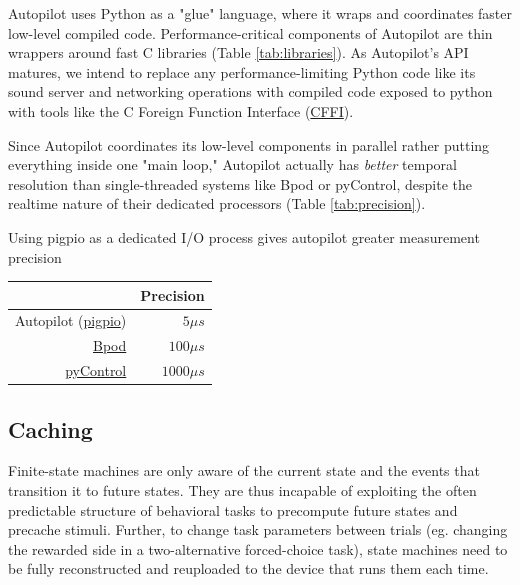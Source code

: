 Autopilot uses Python as a "glue" language, where it wraps and coordinates faster low-level compiled code\citep{vanrossumGlueItAll1998}.  
Performance-critical components of Autopilot are thin wrappers around fast C libraries (Table \ref{tab:libraries}). As Autopilot's API matures, we intend to replace any performance-limiting Python code like its sound server and networking operations with compiled code exposed to python with tools like the C Foreign Function Interface (\href{https://cffi.readthedocs.io/en/latest/index.html}{CFFI}).

Since Autopilot coordinates its low-level components in parallel rather putting everything inside one "main loop," Autopilot actually has \textit{better} temporal resolution than  single-threaded systems like Bpod or pyControl, despite the realtime nature of their dedicated processors (Table \ref{tab:precision}).

\begin{margintable}
\caption{Using pigpio as a dedicated I/O process gives autopilot greater measurement precision}
\label{tab:precision}
\noindent\begin{tabularx}{\linewidth}{rR}\toprule
& Precision \\
\midrule
Autopilot (\href{http://abyz.me.uk/rpi/pigpio/pigpiod.html}{pigpio}) & $5\mu s$ \\
\href{https://github.com/sanworks/Bpod_StateMachine_Firmware/blob/059d1e9195f5bb7d0d5cd7b33f56342eb5a3a55c/Dev/StateMachineFirmware/StateMachineFirmware.ino\#L196}{Bpod} & $100\mu s$ \\
\href{https://github.com/pyControl/code/blob/28cf5ea28ca2764aeea829eba148adfa5239254a/pyControl/framework.py\#L228}{pyControl} & $1000\mu s$ \\
\bottomrule
\end{tabularx}
\end{margintable}

\subsection{Caching}

Finite-state machines are only aware of the current state and the events that transition it to future states. They are thus incapable of exploiting the often predictable structure of behavioral tasks to precompute future states and precache stimuli. Further, to change task parameters between trials (eg. changing the rewarded side in a two-alternative forced-choice task), state machines need to be fully reconstructed and reuploaded to the device that runs them each time.

